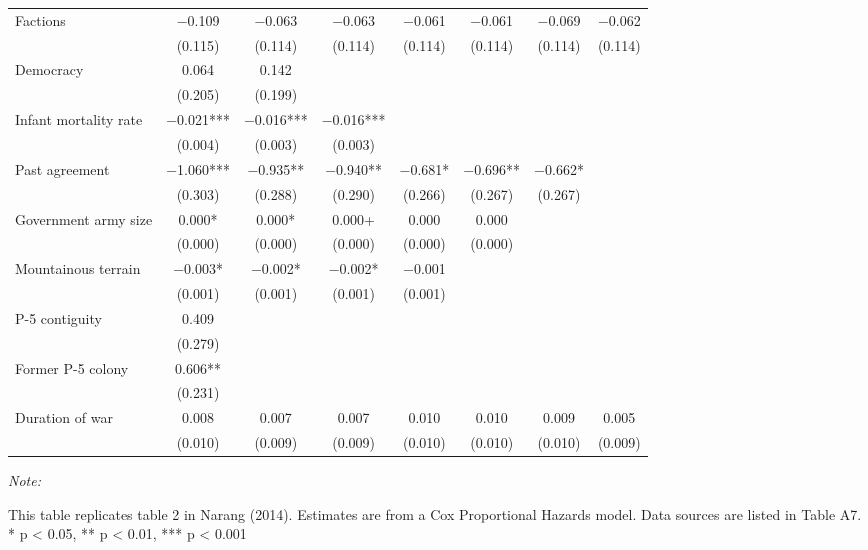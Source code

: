 \begin{table}
\begin{threeparttable}
\begin{tabular}[t]{lccccccc}
Factions & \num{-0.109} & \num{-0.063} & \num{-0.063} & \num{-0.061} & \num{-0.061} & \num{-0.069} & \num{-0.062}\\
 & (\num{0.115}) & (\num{0.114}) & (\num{0.114}) & (\num{0.114}) & (\num{0.114}) & (\num{0.114}) & (\num{0.114})\\
Democracy & \num{0.064} & \num{0.142} &  &  &  &  & \\
 & (\num{0.205}) & (\num{0.199}) &  &  &  &  & \\
Infant mortality rate & \num{-0.021}*** & \num{-0.016}*** & \num{-0.016}*** &  &  &  & \\
 & (\num{0.004}) & (\num{0.003}) & (\num{0.003}) &  &  &  & \\
Past agreement & \num{-1.060}*** & \num{-0.935}** & \num{-0.940}** & \num{-0.681}* & \num{-0.696}** & \num{-0.662}* & \\
 & (\num{0.303}) & (\num{0.288}) & (\num{0.290}) & (\num{0.266}) & (\num{0.267}) & (\num{0.267}) & \\
Government army size & \num{0.000}* & \num{0.000}* & \num{0.000}+ & \num{0.000} & \num{0.000} &  & \\
 & (\num{0.000}) & (\num{0.000}) & (\num{0.000}) & (\num{0.000}) & (\num{0.000}) &  & \\
Mountainous terrain & \num{-0.003}* & \num{-0.002}* & \num{-0.002}* & \num{-0.001} &  &  & \\
 & (\num{0.001}) & (\num{0.001}) & (\num{0.001}) & (\num{0.001}) &  &  & \\
P-5 contiguity & \num{0.409} &  &  &  &  &  & \\
 & (\num{0.279}) &  &  &  &  &  & \\
Former P-5 colony & \num{0.606}** &  &  &  &  &  & \\
 & (\num{0.231}) &  &  &  &  &  & \\
Duration of war & \num{0.008} & \num{0.007} & \num{0.007} & \num{0.010} & \num{0.010} & \num{0.009} & \num{0.005}\\
 & (\num{0.010}) & (\num{0.009}) & (\num{0.009}) & (\num{0.010}) & (\num{0.010}) & (\num{0.010}) & (\num{0.009})\\
\bottomrule
\end{tabular}
\begin{tablenotes}[para]
\item \textit{Note: } 
\item This table replicates table 2 in Narang (2014). Estimates are from a Cox Proportional Hazards model. Data sources are listed in Table A7. * p < 0.05, ** p < 0.01, *** p < 0.001
\end{tablenotes}
\end{threeparttable}
\end{table}
